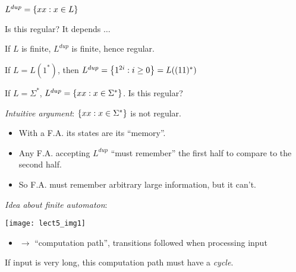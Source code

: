 \begin{example}
    $L^{dup} = \left \{ xx: x \in L \right \}$

    Is this regular? It depends $\ldots$

    If $L$ is finite, $L^{dup}$ is finite, hence regular.

    If $L = L(1^*)$, then $L^{dup} = \left \{ 1^{2i}: i \geq 0 \right \} = L((11)^*)$

    If $L = \Sigma^*$, $L^{dup} = \left \{ xx: x \in \Sigma^* \right \}$. Is this regular?

    \emph{Intuitive argument}: $\left \{ xx: x \in \Sigma^* \right \}$ is not regular.

    \begin{itemize}
        \item With a F.A. its states are its ``memory''.
        \item Any F.A. accepting $L^{dup}$ ``must remember'' the first half to compare to the second half.
        \item So F.A. must remember arbitrary large information, but it can't.
    \end{itemize}
\end{example}

\emph{Idea about finite automaton}:

\begin{unnumfigure}
    \texttt{[image: lect5\_img1]}
\end{unnumfigure}

\begin{itemize}
    \item $\rightarrow$ ``computation path'', transitions followed when processing input
\end{itemize}

If input is very long, this computation path must have a \emph{cycle}.

\backmatter
